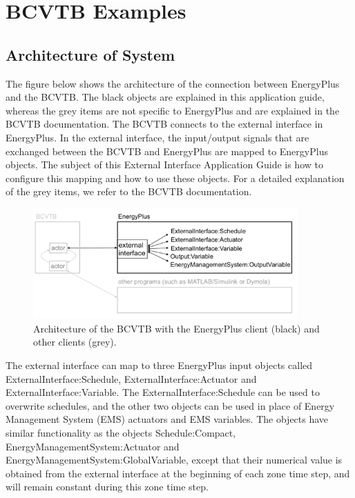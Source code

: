 \section{BCVTB Examples}\label{bcvtb-examples}

\subsection{Architecture of System}\label{architecture-of-system}

The figure below shows the architecture of the connection between EnergyPlus and the BCVTB. The black objects are explained in this application guide, whereas the grey items are not specific to EnergyPlus and are explained in the BCVTB documentation. The BCVTB connects to the external interface in EnergyPlus. In the external interface, the input/output signals that are exchanged between the BCVTB and EnergyPlus are mapped to EnergyPlus objects. The subject of this External Interface Application Guide is how to configure this mapping and how to use these objects. For a detailed explanation of the grey items, we refer to the BCVTB documentation.

\begin{figure}[hbtp] %
\centering
\includegraphics[width=0.9\textwidth, height=0.9\textheight, keepaspectratio=true]{media/image004.png}
\caption{Architecture of the BCVTB with the EnergyPlus client (black) and other clients (grey). \protect \label{fig:architecture-of-the-bcvtb-with-the-energyplus}}
\end{figure}

The external interface can map to three EnergyPlus input objects called ExternalInterface:Schedule, ExternalInterface:Actuator and ExternalInterface:Variable. The ExternalInterface:Schedule can be used to overwrite schedules, and the other two objects can be used in place of Energy Management System (EMS) actuators and EMS variables. The objects have similar functionality as the objects Schedule:Compact, EnergyManagementSystem:Actuator and EnergyManagementSystem:GlobalVariable, except that their numerical value is obtained from the external interface at the beginning of each zone time step, and will remain constant during this zone time step.

